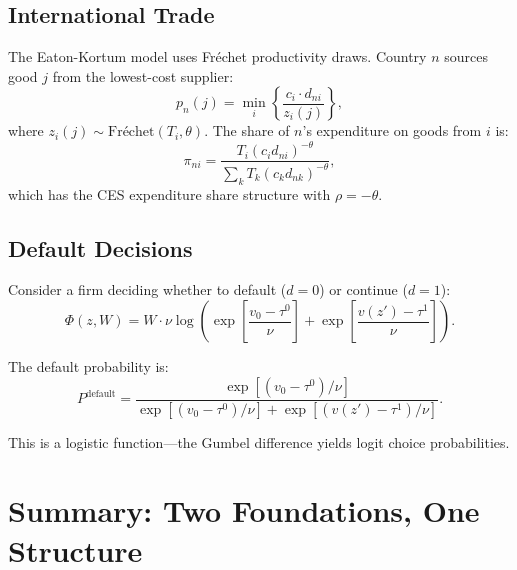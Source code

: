 \subsection{International Trade}

The Eaton-Kortum model uses Fréchet productivity draws. Country $n$ sources good $j$ from the lowest-cost supplier:
\begin{equation}
p_n(j) = \min_i \left\{ \frac{c_i \cdot d_{ni}}{z_i(j)} \right\},
\end{equation}
where $z_i(j) \sim \text{Fréchet}(T_i, \theta)$. The share of $n$'s expenditure on goods from $i$ is:
\begin{equation}
\pi_{ni} = \frac{T_i (c_i d_{ni})^{-\theta}}{\sum_k T_k (c_k d_{nk})^{-\theta}},
\end{equation}
which has the CES expenditure share structure with $\rho = -\theta$.

\subsection{Default Decisions}

Consider a firm deciding whether to default ($d=0$) or continue ($d=1$):
\begin{equation}
\Phi(z, W) = W \cdot \nu \log \left( \exp\left[ \frac{v_0 - \tau^0}{\nu} \right] + \exp\left[ \frac{v(z') - \tau^1}{\nu} \right] \right).
\end{equation}

The default probability is:
\begin{equation}
P^{\text{default}} = \frac{\exp[(v_0 - \tau^0)/\nu]}{\exp[(v_0 - \tau^0)/\nu] + \exp[(v(z') - \tau^1)/\nu]}.
\end{equation}

This is a logistic function---the Gumbel difference yields logit choice probabilities.

\section{Summary: Two Foundations, One Structure}
\label{sec:discrete-summary}

